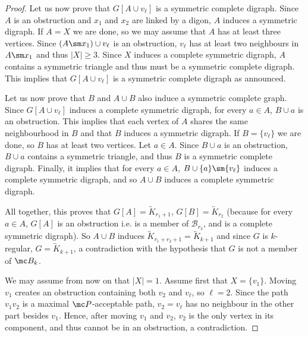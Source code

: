 \begin{proof}
Let us now prove that $G[A\cup v_{\ell}]$ is a symmetric complete digraph. 
Since $A$ is an obstruction and $x_1$ and $x_2$ are linked by a digon, $A$  induces a symmetric digraph. 
If $A = X$ we are done, so we may assume that $A$ has at least three vertices. 
Since $(A \sm x_1) \cup v_{\ell}$ is an obstruction, $v_{\ell}$ has at least two neighbours in  $A \sm x_1$ and thus $|X| \geq 3$. 
Since $X$ induces a complete symmetric digraph, $A$ contains a symmetric triangle and thus must be a symmetric complete digraph. This implies that $G[A\cup v_{\ell}]$ is a symmetric complete digraph as announced. 

Let us now prove that $B$ and $A \cup B$ also induce a symmetric complete graph. 
Since $G[A \cup v_{\ell}]$ induces a complete symmetric digraph, for every $a \in A$, $B \cup a$ is an obstruction. This implies that each vertex of $A$ shares the same neighbourhood in $B$ and that $B$ induces a symmetric digraph.  
If $B = \{v_{\ell}\}$ we are done, so $B$ has at least two vertices. Let $a \in A$. 
Since $B \cup a$ is an obstruction, $B \cup a$ contains a symmetric triangle, and thus $B$ is a symmetric complete digraph. Finally, it implies that for every $a \in A$, $B \cup \{a\} \sm \{v_{\ell}\}$ induces a complete symmetric digraph, and so $A \cup B$ induces a complete symmetric digraph. 

All together, this proves that $G[A] = \overleftrightarrow K_{r_1+1}$, $G[B] = \overleftrightarrow K_{r_2}$ (because for every $a \in A$, $G[A]$ is an obstruction i.e. is a member of $\mathcal B_{r_2}$, and is a complete symmetric digraph). So $A \cup B$ induces $\overleftrightarrow K_{r_1 + r_2 + 1} = \overleftrightarrow K_{k+1}$ and since $G$ is $k$-regular, $G = \overleftrightarrow K_{k+1}$, a contradiction with the hypothesis that $G$ is not a member of $\mc B_{k}$. 
\medskip 

We may assume from now on that $|X| = 1$. 
Assume first that $X= \{v_1\}$. 
Moving $v_1$ creates an obstruction containing both $v_2$ and $v_{\ell}$, so $\ell = 2$. 
Since the path $v_1v_2$ is a maximal $\mc P$-acceptable path, $v_2 = v_{\ell}$ has no neighbour in the other part besides $v_1$. 
Hence, after moving $v_1$ and $v_2$, $v_2$ is the only vertex in its component, and thus cannot be in an obstruction, a contradiction. 


\end{proof}
